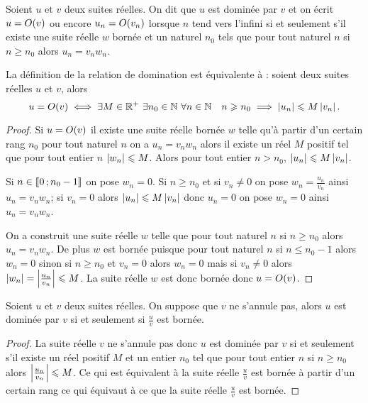 \begin{defdef}
  Soient \(u\) et \(v\) deux suites réelles. On dit que \(u\) est dominée par \(v\) et on écrit \(u=O\mathopen{}\left(v\right)\) ou encore \(u_n=O\mathopen{}\left(v_n\right)\) lorsque \(n\) tend vers l'infini si et seulement s'il existe une suite réelle \(w\) bornée et un naturel \(n_0\) tels que pour tout naturel \(n\) si \(n \geqslant n_0\) alors \(u_n = v_n w_n\). 
\end{defdef}
\begin{prop}
  La définition de la relation de domination est équivalente à : soient deux suites réelles \(u\) et \(v\), alors
  \begin{equation}
    u=O\mathopen{}\left(v\right) \iff \exists M \in \mathbb{R}^{+} \ \exists n_0 \in \mathbb{N} \ \forall n \in \mathbb{N} \quad n \geqslant n_0 \implies \left\lvert u_n\right\rvert \leqslant M \left\lvert v_n\right\rvert.
  \end{equation}
\end{prop}
\begin{proof}
  Si \(u=O\mathopen{}\left(v\right)\) il existe une suite réelle bornée \(w\) telle qu'à partir d'un certain rang \(n_0\) pour tout naturel \(n\) on a \(u_n=v_n w_n\) alors il existe un réel \(M\) positif tel que pour tout entier \(n\) \(\left\lvert w_n\right\rvert \leqslant M\). Alors pour tout entier \(n > n_0\), \(\left\lvert u_n\right\rvert\leqslant M \left\lvert v_n\right\rvert\).

Si \(n \in \mathopen{\llbracket}0\mathclose{}\mathpunct{};n_0-1\mathclose{\rrbracket}\) on pose \(w_n=0\). Si \(n \geqslant n_0\) et si \(v_n \neq 0\) on pose \(w_n = \frac{u_n}{v_n}\) ainsi \(u_n = v_n w_n\); si \(v_n = 0\) alors \(\left\lvert u_n\right\rvert \leqslant M \left\lvert v_n\right\rvert\) donc \(u_n=0\) on pose \(w_n=0\) ainsi \(u_n=v_n w_n\).

On a construit une suite réelle \(w\) telle que pour tout naturel \(n\) si \(n \geqslant n_0\) alors \(u_n = v_n w_n\). De plus \(w\) est bornée puisque pour tout naturel \(n\) si \(n \leqslant n_0 -1\) alors \(w_n=0\) sinon si \(n \geqslant n_0\) et \(v_n=0\) alors \(w_n=0\) mais si \(v_n \neq 0\) alors \(\left\lvert w_n\right\rvert=\left\lvert\frac{u_n}{v_n}\right\rvert \leqslant M\). La suite réelle \(w\) est donc bornée donc \(u=O\mathopen{}\left(v\right)\).
\end{proof}
\begin{prop}
  Soient \(u\) et \(v\) deux suites réelles. On suppose que \(v\) ne s'annule pas, alors \(u\) est dominée par \(v\) si et seulement si \(\frac{u}{v}\) est bornée.
\end{prop}
\begin{proof}
  La suite réelle \(v\) ne s'annule pas donc \(u\) est dominée par \(v\) si et seulement s'il existe un réel positif \(M\) et un entier \(n_0\) tel que pour tout entier \(n\) si \(n \geqslant n_0\) alors \(\left\lvert\frac{u_n}{v_n}\right\rvert \leqslant M\). Ce qui est équivalent à la suite réelle \(\frac{u}{v}\) est bornée à partir d'un certain rang ce qui équivaut à  ce que la suite réelle \(\frac{u}{v}\) est bornée.
\end{proof}


